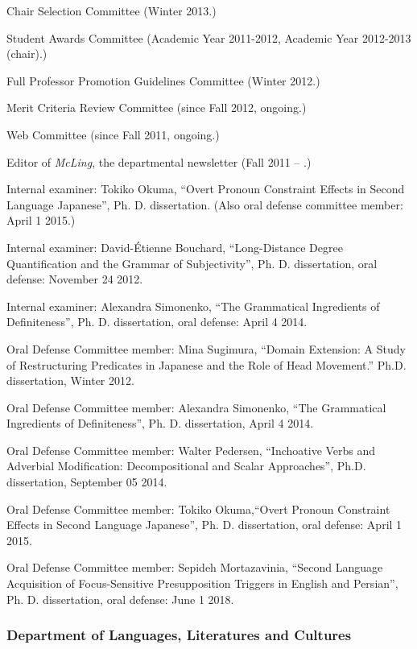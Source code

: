 \documentclass[11pt]{article}
\begin{document}
Chair Selection Committee (Winter 2013.)


Student Awards Committee (Academic Year 2011-2012, Academic Year
2012-2013 (chair).)


Full Professor Promotion Guidelines Committee (Winter 2012.)


Merit Criteria Review Committee (since Fall 2012, ongoing.)

Web Committee  (since Fall 2011, ongoing.)

Editor of \textit{McLing}, the departmental newsletter (Fall 2011 --
.)

Internal examiner:  Tokiko Okuma, ``Overt Pronoun Constraint Effects in Second Language Japanese'', Ph. D. dissertation. (Also oral defense committee member: April 1 2015.)

Internal examiner:  David-\'Etienne Bouchard, ``Long-Distance Degree Quantification and the
Grammar of Subjectivity'', Ph. D. dissertation, oral defense: November
24 2012.

Internal examiner:  Alexandra Simonenko, ``The Grammatical Ingredients
of Definiteness'', Ph. D. dissertation, oral defense: April 4 2014.

Oral Defense Committee member: Mina Sugimura, ``Domain Extension:  A Study of Restructuring
Predicates in Japanese and the Role of Head Movement.''
Ph.D. dissertation, Winter 2012. 

Oral Defense Committee member:   Alexandra Simonenko, ``The Grammatical Ingredients
of Definiteness'', Ph. D. dissertation, April 4 2014.

Oral Defense Committee member:  Walter Pedersen, ``Inchoative Verbs and Adverbial Modification: Decompositional and Scalar Approaches'', Ph.D. dissertation, September 05 2014.

Oral Defense Committee member:  Tokiko Okuma,``Overt Pronoun Constraint Effects in Second Language Japanese'', Ph. D. dissertation, oral defense: April 1 2015.

Oral Defense Committee member: Sepideh Mortazavinia, ``Second Language Acquisition of Focus-Sensitive Presupposition Triggers in English and Persian'',  Ph. D. dissertation, oral defense: June 1 2018.


\vspace{-10pt}

\subsubsection*{Department of Languages, Literatures and Cultures}
\end{document}
